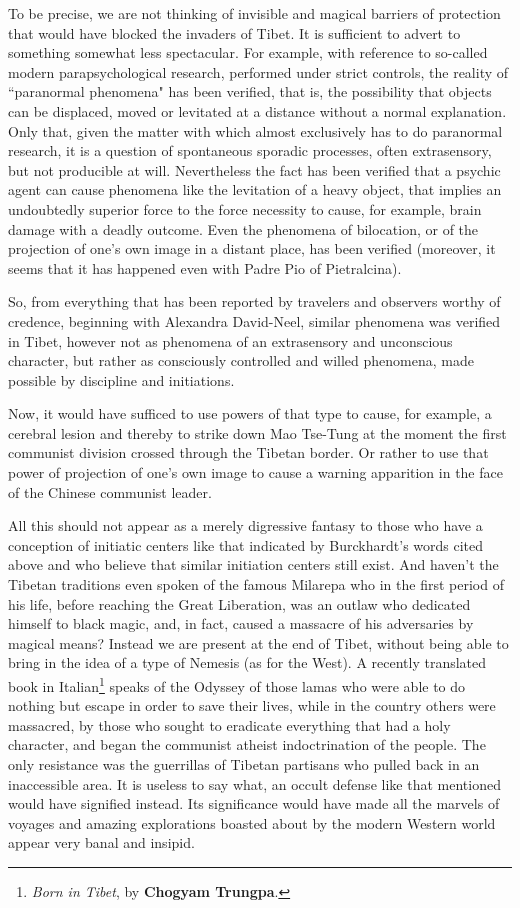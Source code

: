 To be precise, we are not thinking of invisible and magical barriers of protection that would have blocked the invaders of Tibet. It is sufficient to advert to something somewhat less spectacular. For example, with reference to so-called modern parapsychological research, performed under strict controls, the reality of ``paranormal phenomena" has been verified, that is, the possibility that objects can be displaced, moved or levitated at a distance without a normal explanation. Only that, given the matter with which almost exclusively has to do paranormal research, it is a question of spontaneous sporadic processes, often extrasensory, but not producible at will. Nevertheless the fact has been verified that a psychic agent can cause phenomena like the levitation of a heavy object, that implies an undoubtedly superior force to the force necessity to cause, for example, brain damage with a deadly outcome. Even the phenomena of bilocation, or of the projection of one's own image in a distant place, has been verified (moreover, it seems that it has happened even with Padre Pio of Pietralcina).

So, from everything that has been reported by travelers and observers worthy of credence, beginning with Alexandra David-Neel, similar phenomena was verified in Tibet, however not as phenomena of an extrasensory and unconscious character, but rather as consciously controlled and willed phenomena, made possible by discipline and initiations.

Now, it would have sufficed to use powers of that type to cause, for example, a cerebral lesion and thereby to strike down Mao Tse-Tung at the moment the first communist division crossed through the Tibetan border. Or rather to use that power of projection of one's own image to cause a warning apparition in the face of the Chinese communist leader.

All this should not appear as a merely digressive fantasy to those who have a conception of initiatic centers like that indicated by Burckhardt's words cited above and who believe that similar initiation centers still exist. And haven't the Tibetan traditions even spoken of the famous Milarepa who in the first period of his life, before reaching the Great Liberation, was an outlaw who dedicated himself to black magic, and, in fact, caused a massacre of his adversaries by magical means? Instead we are present at the end of Tibet, without being able to bring in the idea of a type of Nemesis (as for the West). A recently translated book in Italian\footnote{\textit{Born in Tibet}, by \textbf{Chogyam Trungpa}.} speaks of the Odyssey of those lamas who were able to do nothing but escape in order to save their lives, while in the country others were massacred, by those who sought to eradicate everything that had a holy character, and began the communist atheist indoctrination of the people. The only resistance was the guerrillas of Tibetan partisans who pulled back in an inaccessible area. It is useless to say what, an occult defense like that mentioned would have signified instead. Its significance would have made all the marvels of voyages and amazing explorations boasted about by the modern Western world appear very banal and insipid.

